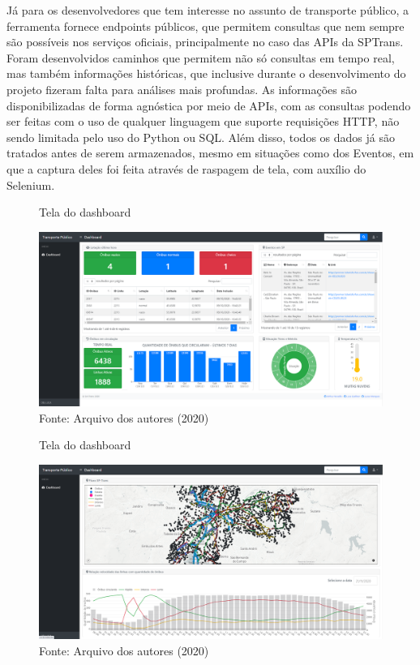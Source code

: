 \indent
\par Já para os desenvolvedores que tem interesse no assunto de transporte público, a ferramenta fornece endpoints públicos, que permitem consultas que nem sempre são possíveis nos serviços oficiais, principalmente no caso das APIs da SPTrans. Foram desenvolvidos caminhos que permitem não só consultas em tempo real, mas também informações históricas, que inclusive durante o desenvolvimento do projeto fizeram falta para análises mais profundas. As informações são disponibilizadas de forma agnóstica por meio de APIs, com as consultas podendo ser feitas com o uso de qualquer linguagem que suporte requisições HTTP, não sendo limitada pelo uso do Python ou SQL. Além disso, todos os dados já são tratados antes de serem armazenados, mesmo em situações como dos Eventos, em que a captura deles foi feita através de raspagem de tela, com auxílio do Selenium.

\begin{figure}[H]
    \centering
    \caption{Tela do dashboard}
    \includegraphics[width=1.0\linewidth]{Imagens/dashboard1.png}
    \caption*{Fonte: Arquivo dos autores (2020)}
    \label{telaDashboard1}
\end{figure}

\begin{figure}[H]
    \centering
    \caption{Tela do dashboard}
    \includegraphics[width=1.0\linewidth]{Imagens/dashboard2.png}
    \caption*{Fonte: Arquivo dos autores (2020)}
    \label{telaDashboard2}
\end{figure}









